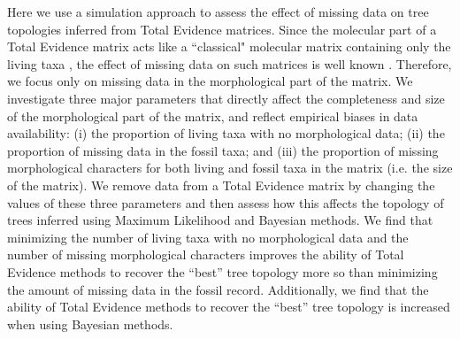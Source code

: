 \documentclass[12pt,letterpaper]{article}
\begin{document}
Here we use a simulation approach to assess the effect of missing data on tree topologies inferred from Total Evidence matrices.
Since the molecular part of a Total Evidence matrix acts like a ``classical" molecular matrix containing only the living taxa \citep{ronquista2012}, the effect of missing data on such matrices is well known \citep{wiensmissing2006,wiensmissing2008,lemmonthe2009,rouresite-specific2011}.
Therefore, we focus only on missing data in the morphological part of the matrix.
We investigate three major parameters that directly affect the completeness and size of the morphological part of the matrix, and reflect empirical biases in data availability: (i) the proportion of living taxa with no morphological data; (ii) the proportion of missing data in the fossil taxa; and (iii) the proportion of missing morphological characters for both living and fossil taxa in the matrix (i.e. the size of the matrix).
We remove data from a Total Evidence matrix by changing the values of these three parameters and then assess how this affects the topology of trees inferred using Maximum Likelihood and Bayesian methods. We find that minimizing the number of living taxa with no morphological data and the number of missing morphological characters improves the ability of Total Evidence methods to recover the ``best'' tree topology more so than minimizing the amount of missing data in the fossil record.
Additionally, we find that the ability of Total Evidence methods to recover the ``best'' tree topology is increased when using Bayesian methods.


%
%
 
\end{document}

